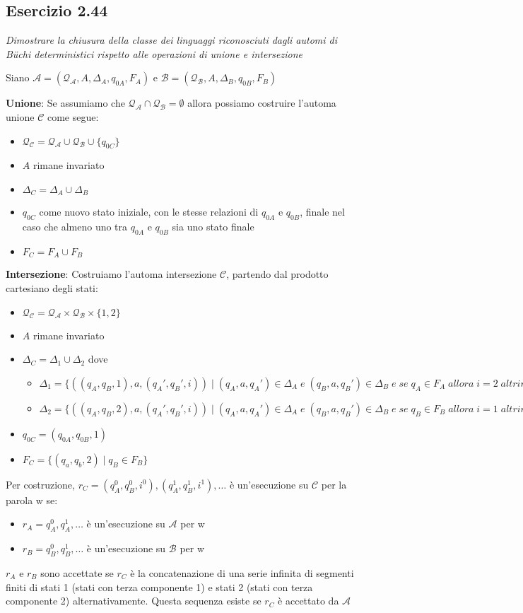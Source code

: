 \documentclass[12pt]{article}
\newcommand{\buchi}{B\"uchi }
\begin{document}
\subsection*{Esercizio 2.44}
\textit{Dimostrare la chiusura della classe dei linguaggi riconosciuti dagli automi di \buchi deterministici rispetto alle operazioni di unione e intersezione}

Siano $\mathcal{A} = (\mathcal{Q_A},A,\Delta_A,q_{0A},F_A)$ e $\mathcal{B} = (\mathcal{Q_B},A,\Delta_B,q_{0B},F_B)$

\textbf{Unione}: Se assumiamo che $ \mathcal{Q_A} \cap \mathcal{Q_B} = \emptyset$ allora possiamo costruire l'automa unione $\mathcal{C}$ come segue:
\begin{itemize}
	\item $\mathcal{Q_C} = \mathcal{Q_A} \cup \mathcal{Q_B} \cup \{q_{0C}\}$
	\item $A$ rimane invariato
	\item $\Delta_C = \Delta_A \cup \Delta_B$
	\item $q_{0C}$ come nuovo stato iniziale, con le stesse relazioni di $q_{0A}$ e $q_{0B}$, finale nel caso che almeno uno tra $q_{0A}$ e $q_{0B}$ sia uno stato finale
	\item $F_C = F_A \cup F_B$
\end{itemize}
\textbf{Intersezione}: Costruiamo l'automa intersezione $\mathcal{C}$, partendo dal prodotto cartesiano degli stati:
\begin{itemize}
	\item $\mathcal{Q_C} = \mathcal{Q_A} \times \mathcal{Q_B} \times \{1,2\}$
	\item $A$ rimane invariato
	\item $\Delta_C = \Delta_1 \cup \Delta_2$ dove
	\begin{itemize}
		\item $\Delta_1 = \{ ((q_A,q_B,1),a,(q_{A}',q_{B}',i)) \; | \; (q_A,a,q_A') \in \Delta_A\;e\;(q_B,a,q_B') \in \Delta_B\;e\;se\;q_A\in F_A\;allora\;i=2\;altrimenti\;i=1\}$
		\item $\Delta_2 = \{ ((q_A,q_B,2),a,(q_{A}',q_{B}',i)) \; | \; (q_A,a,q_A') \in \Delta_A\;e\;(q_B,a,q_B') \in \Delta_B\;e\;se\;q_B\in F_B\;allora\;i=1\;altrimenti\;i=2\}$
	\end{itemize}
	\item $q_{0C} = (q_{0A},q_{0B},1)$
	\item $F_C = \{(q_a,q_b,2)\;|\;q_B \in F_B\}$
\end{itemize}
Per costruzione, $r_C=(q_{A}^0,q_{B}^0,i^0),(q_{A}^1,q_{B}^1,i^1),\ldots$ è un'esecuzione su $\mathcal{C}$ per la parola w se:
\begin{itemize}
	\item $r_A=q_{A}^0,q_{A}^1,\ldots$ è un'esecuzione su $\mathcal{A}$ per w
	\item $r_B=q_{B}^0,q_{B}^1,\ldots$ è un'esecuzione su $\mathcal{B}$ per w
\end{itemize}
$r_A$ e $r_B$ sono accettate se $r_C$ è la concatenazione di una serie infinita di segmenti finiti di stati 1 (stati con terza componente 1) e stati 2 (stati con terza componente 2) alternativamente. Questa sequenza esiste se $r_C$ è accettato da $\mathcal{A}$ 
\end{document}
